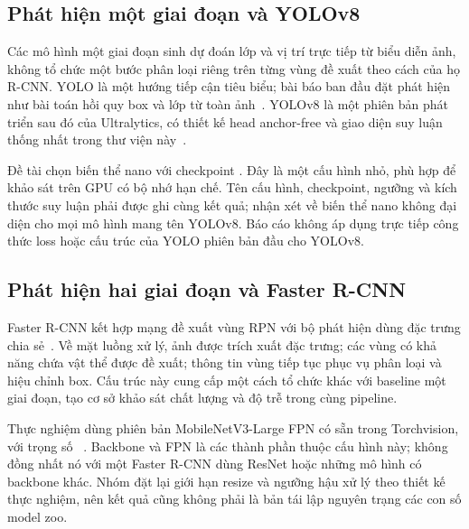 \subsection{Phát hiện một giai đoạn và YOLOv8}
Các mô hình một giai đoạn sinh dự đoán lớp và vị trí trực tiếp từ biểu diễn ảnh, không tổ chức một bước phân loại riêng trên từng vùng đề xuất theo cách của họ R-CNN. YOLO là một hướng tiếp cận tiêu biểu; bài báo ban đầu đặt phát hiện như bài toán hồi quy box và lớp từ toàn ảnh~\cite{redmon2016yolo}. YOLOv8 là một phiên bản phát triển sau đó của Ultralytics, có thiết kế head anchor-free và giao diện suy luận thống nhất trong thư viện này~\cite{ultralyticsv8}.

Đề tài chọn biến thể nano với checkpoint . Đây là một cấu hình nhỏ, phù hợp để khảo sát trên GPU có bộ nhớ hạn chế. Tên cấu hình, checkpoint, ngưỡng và kích thước suy luận phải được ghi cùng kết quả; nhận xét về biến thể nano không đại diện cho mọi mô hình mang tên YOLOv8. Báo cáo không áp dụng trực tiếp công thức loss hoặc cấu trúc của YOLO phiên bản đầu cho YOLOv8.

\subsection{Phát hiện hai giai đoạn và Faster R-CNN}
Faster R-CNN kết hợp mạng đề xuất vùng RPN với bộ phát hiện dùng đặc trưng chia sẻ~\cite{ren2015faster}. Về mặt luồng xử lý, ảnh được trích xuất đặc trưng; các vùng có khả năng chứa vật thể được đề xuất; thông tin vùng tiếp tục phục vụ phân loại và hiệu chỉnh box. Cấu trúc này cung cấp một cách tổ chức khác với baseline một giai đoạn, tạo cơ sở khảo sát chất lượng và độ trễ trong cùng pipeline.

Thực nghiệm dùng phiên bản MobileNetV3-Large FPN có sẵn trong Torchvision, với trọng số ~\cite{torchvisionfaster}. Backbone và FPN là các thành phần thuộc cấu hình này; không đồng nhất nó với một Faster R-CNN dùng ResNet hoặc những mô hình có backbone khác. Nhóm đặt lại giới hạn resize và ngưỡng hậu xử lý theo thiết kế thực nghiệm, nên kết quả cũng không phải là bản tái lập nguyên trạng các con số model zoo.

